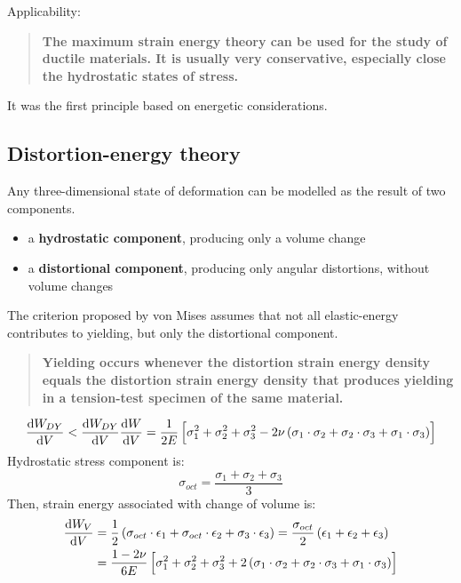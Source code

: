 Applicability:
\begin{quotation}
  \textbf{The maximum strain energy theory can be used for the study of ductile materials. It is usually very conservative, especially close the hydrostatic states of stress.}
\end{quotation}
It was the first principle based on energetic considerations.
\subsection{Distortion-energy theory}
Any three-dimensional state of deformation can be modelled as the result of two components.
\begin{itemize}
  \item a \textbf{hydrostatic component}, producing only a volume change
  \item a \textbf{distortional component}, producing only angular distortions, without volume changes
\end{itemize}
The criterion proposed by von Mises assumes that not all elastic-energy contributes to yielding, but only the distortional component.
\begin{quotation}
  \textbf{Yielding occurs whenever the distortion strain energy density equals the distortion strain energy density that produces yielding in a tension-test specimen of the same material.}
\end{quotation}
\begin{gather}
  \frac{\dif W_{DY}}{\dif V} < \frac{\dif W_{DY}}{\dif V}
  \frac{\dif W}{\dif V} = \frac{1}{2E} \left[ \sigma_1^2 + \sigma_2^2 + \sigma_3^2 - 2\nu \left( \sigma_1 \cdot \sigma_2 + \sigma_2 \cdot \sigma_3 + \sigma_1 \cdot \sigma_3 \right) \right]
\end{gather}
Hydrostatic stress component is:
\begin{equation}
  \sigma_{oct} = \frac{\sigma_1 + \sigma_2 + \sigma_3}{3}
\end{equation}
Then, strain energy associated with change of volume is:
\begin{align}
  \frac{\dif W_V}{\dif V} & = \frac{1}{2} \left( \sigma_{oct} \cdot \epsilon_1 + \sigma_{oct} \cdot \epsilon_2 + \sigma_3 \cdot \epsilon_3\right) = \frac{\sigma_{oct}}{2} \left(\epsilon_1 + \epsilon_2 + \epsilon_3\right) \\
                          & = \frac{1 - 2\nu}{6E} \left[\sigma_1^2 + \sigma_2^2 + \sigma_3^2 + 2 \left(\sigma_1\cdot\sigma_2 + \sigma_2\cdot\sigma_3 + \sigma_1\cdot\sigma_3\right)\right]
\end{align}
